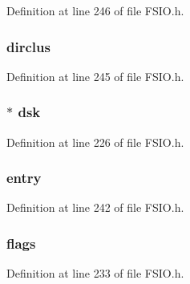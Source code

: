 Definition at line 246 of file F\+S\+I\+O.\+h.

\hypertarget{struct_f_s_f_i_l_e_acb9aeba327999a325ac766eaf82ff1d8}{}
\subsubsection[{dirclus}]{ dirclus}\label{struct_f_s_f_i_l_e_acb9aeba327999a325ac766eaf82ff1d8}


Definition at line 245 of file F\+S\+I\+O.\+h.

\hypertarget{struct_f_s_f_i_l_e_ac85f8ccbe86b0dbd5c1e4d93fb840a9f}{}
\subsubsection[{dsk}]{$\ast$ dsk}\label{struct_f_s_f_i_l_e_ac85f8ccbe86b0dbd5c1e4d93fb840a9f}


Definition at line 226 of file F\+S\+I\+O.\+h.

\hypertarget{struct_f_s_f_i_l_e_a2e2abdcf887d2d03210f168f872800fc}{}
\subsubsection[{entry}]{ entry}\label{struct_f_s_f_i_l_e_a2e2abdcf887d2d03210f168f872800fc}


Definition at line 242 of file F\+S\+I\+O.\+h.

\hypertarget{struct_f_s_f_i_l_e_a67579dbaf2e7ffe28f82394c7dbc05b4}{}
\subsubsection[{flags}]{ flags}\label{struct_f_s_f_i_l_e_a67579dbaf2e7ffe28f82394c7dbc05b4}


Definition at line 233 of file F\+S\+I\+O.\+h.

\hypertarget{struct_f_s_f_i_l_e_af7fe269d31112a5ebefb4b54f0493e90}{}
